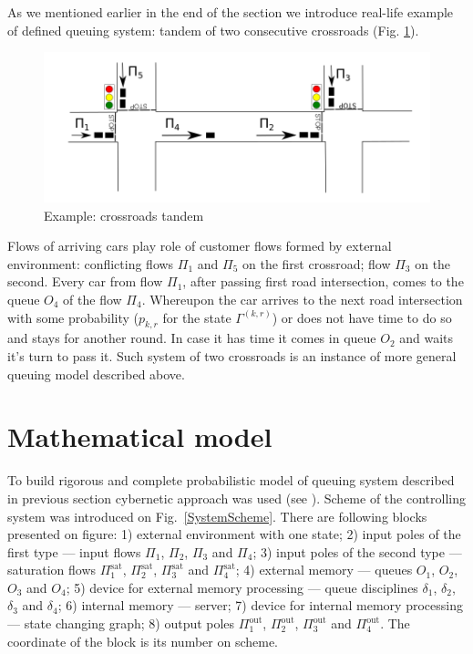 \documentclass[10pt]{article}
\begin{document}
As we mentioned earlier in the end of the section we introduce real-life example of defined queuing system: tandem of two consecutive crossroads (Fig. \ref{crossroads}). 
\begin{figure}[h!]
   \centering
    \includegraphics[width=\textwidth]{Crossroads.png} %
    \caption {Example: crossroads tandem}
    \label{crossroads}
\end{figure}
Flows of arriving cars play role of customer flows formed by external environment: conflicting flows $\Pi_1$ and $\Pi_5$ on the first crossroad; flow $\Pi_3$ on the second. Every car from flow $\Pi_1$, after passing first road intersection, comes to the queue $O_4$ of the flow $\Pi_4$. Whereupon the car arrives to the next road intersection with some probability ($p_{k,r}$ for the state $\Gamma^{(k,r)}$) or does not have time to do so and stays for another round. In case it has time it comes in queue $O_2$ and waits it's turn to pass it. Such system of two crossroads is an instance of more general queuing model described above.

\section{Mathematical model}
To build rigorous and complete probabilistic model of queuing system described in previous section cybernetic approach was used (see \cite{Fedotkin:1988}). Scheme of the controlling system was introduced on Fig.~\ref{SystemScheme}. There are following blocks presented on figure: 1) external environment with one state; 2) input poles of the first type --- input flows $\Pi_1$, $\Pi_2$, $\Pi_3$ and $\Pi_4$; 3) input poles of the second type --- saturation flows $\Pi^{\mathrm{\text{sat}}}_1$, $\Pi^{\mathrm{\text{sat}}}_2$, $\Pi^{\mathrm{\text{sat}}}_3$ and $\Pi^{\mathrm{\text{sat}}}_4$; 4) external memory --- queues $O_1$, $O_2$, $O_3$ and $O_4$; 5) device for external memory processing --- queue disciplines $\delta_1$, $\delta_2$, $\delta_3$ and $\delta_4$; 6) internal memory --- server; 7)  device for internal memory processing --- state changing graph; 8) output poles $\Pi^{\mathrm{\text{out}}}_1$, $\Pi^{\mathrm{\text{out}}}_2$, $\Pi^{\mathrm{\text{out}}}_3$ and $\Pi^{\mathrm{\text{out}}}_4$.
The coordinate of the block is its number on scheme.
\end{document}
